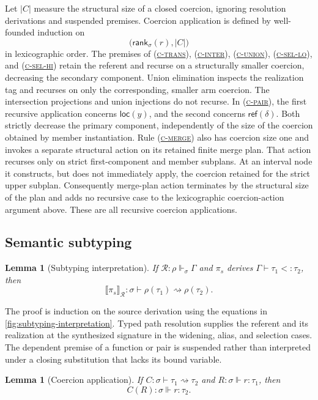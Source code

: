 \documentclass[acmsmall,screen,nonacm]{acmart}
\newtheorem{lemma}[theorem]{Lemma}
\newcommand{\ruleref}[1]{%
  \textsc{(\hyperref[rule:#1]{#1})}}
\newcommand{\loc}[1]{\mathsf{loc}(#1)}
\newcommand{\referentof}[1]{\mathsf{ref}(#1)}
\newcommand{\realizes}{\Vdash}
\newcommand{\coerce}{\mathrel{\rightsquigarrow}}
\newcommand{\compilepi}[2]{\llbracket #2\rrbracket_{#1}}
\newcommand{\action}[2]{#1(#2)}
\begin{document}
Let \(|C|\) measure the structural size of a closed coercion, ignoring
resolution derivations and suspended premises. Coercion application is
defined by well-founded induction on
\[
  \bigl(\mathsf{rank}_\sigma(r),|C|\bigr)
\]
in lexicographic order. The premises of \ruleref{c-trans},
\ruleref{c-inter}, \ruleref{c-union}, \ruleref{c-sel-lo}, and
\ruleref{c-sel-hi} retain the referent and recurse on a structurally smaller
coercion, decreasing the secondary component. Union elimination inspects the
realization tag and recurses on only the corresponding, smaller arm coercion.
The intersection projections and union injections do not recurse. In
\ruleref{c-pair}, the first recursive application concerns \(\loc y\), and the
second concerns \(\referentof{\delta}\).  Both strictly decrease the primary
component, independently of the size of the coercion obtained by member
instantiation. Rule \ruleref{c-merge} also has coercion size one and invokes a
separate structural action on its retained finite merge plan. That action
recurses only on strict first-component and member subplans. At an interval
node it constructs, but does not immediately apply, the coercion retained for
the strict upper subplan. Consequently merge-plan action terminates by the
structural size of the plan and adds no recursive case to the lexicographic
coercion-action argument above. These are all recursive coercion applications.

\subsection{Semantic subtyping}
\label{sec:coercion-totality}

\begin{lemma}[Subtyping interpretation]
\label{lem:coercion-construction}
If \(\mathcal R:\rho\realizes_\sigma\Gamma\) and
\(\pi_s\) derives \(\Gamma\vdash\tau_1<:\tau_2\), then
\[
  \compilepi{\mathcal R}{\pi_s}:
  \sigma\vdash\rho(\tau_1)\coerce\rho(\tau_2).
\]
\end{lemma}

The proof is induction on the source derivation using the equations in
\cref{fig:subtyping-interpretation}. Typed path resolution supplies the
referent and its realization at the synthesized signature in the widening,
alias, and selection
cases. The dependent premise of a function or pair is suspended rather than
interpreted under a closing substitution that lacks its bound variable.

\begin{lemma}[Coercion application]
\label{lem:coercion-action}
If \(C:\sigma\vdash\tau_1\coerce\tau_2\) and
\(R:\sigma\realizes r:\tau_1\), then
\[
  \action{C}{R}:\sigma\realizes r:\tau_2.
\]
\end{lemma}
\end{document}
